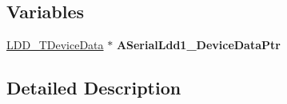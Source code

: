 \subsection*{Variables}
\begin{DoxyCompactItemize}
\item 
\mbox{\label{group___u_a_r_t0__module_ga19d4b715e209f6228d76c65b3d3e13b1}} 
\hyperlink{group___p_e___types__module_gac5cf1362f1f0e3a2ce71b1bf2276d091}{L\+D\+D\+\_\+\+T\+Device\+Data} $\ast$ {\bfseries A\+Serial\+Ldd1\+\_\+\+Device\+Data\+Ptr}
\end{DoxyCompactItemize}


\subsection{Detailed Description}
